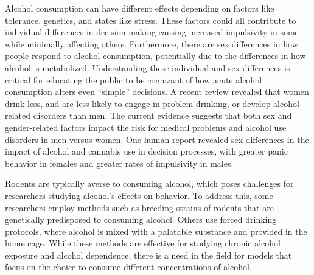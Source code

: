 \documentclass{article}
\begin{document}
Alcohol consumption can have different effects depending on factors like tolerance, genetics, and states like stress\cite{weafer2008individual}. These factors could all contribute to individual differences in decision-making causing increased impulsivity in some\cite{weissenborn2003acute} while minimally affecting others\cite{hammersley1994individual}. Furthermore, there are sex differences in how people respond to alcohol consumption\cite{zachry2019sex}, potentially due to the differences in how alcohol is metabolized\cite{collins1975variations}. Understanding these individual and sex differences is critical for educating the public to be cognizant of how acute alcohol consumption alters even “simple” decisions. A recent review revealed that women drink less, and are less likely to engage in problem drinking, or develop alcohol-related disorders than men\cite{erol2015sex}. The current evidence suggests that both sex and gender-related factors impact the risk for medical problems and alcohol use disorders in men versus women. One human report revealed sex differences in the impact of alcohol and cannabis use in decision processes, with greater panic behavior in females and greater rates of impulsivity in males\cite{phillips2017cannabis}.

\vspace{1em}

Rodents are typically averse to consuming alcohol\cite{anderson2010ethanol, pautassi2011ethanol}, which poses challenges for researchers studying alcohol's effects on behavior. To address this, some researchers employ methods such as breeding strains of rodents that are genetically predisposed to consuming alcohol\cite{timme2020alcohol, borruto2021genetically, sauton2021interstrain}. Others use forced drinking protocols, where alcohol is mixed with a palatable substance and provided in the home cage\cite{thiele2014drinking, mendoza2018forced}. While these methods are effective for studying chronic alcohol exposure and alcohol dependence, there is a need in the field for models that focus on the choice to consume different concentrations of alcohol.

\vspace{1em}
\end{document}
